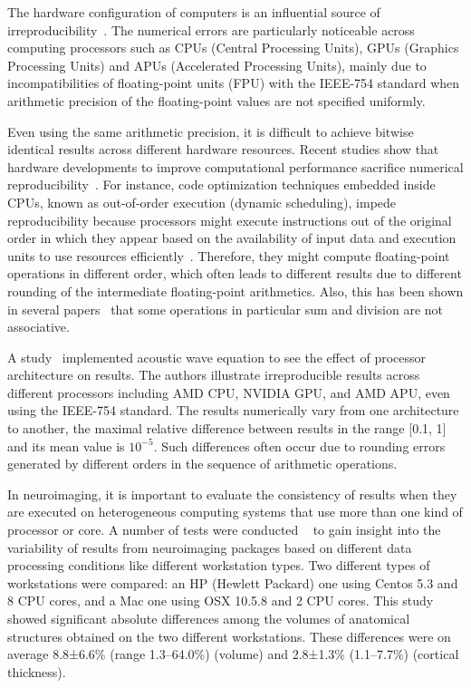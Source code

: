 The hardware configuration of computers is an 
influential source of irreproducibility~\cite{hill2017numerical}. 
The numerical errors are particularly noticeable across computing processors 
such as CPUs (Central Processing Units), GPUs (Graphics Processing 
Units) and APUs (Accelerated Processing Units), mainly due to incompatibilities 
of floating-point units (FPU) with the IEEE-754 standard when 
arithmetic precision of the floating-point values are not specified 
uniformly.

Even using the same arithmetic precision, it is difficult to achieve 
bitwise identical results across different hardware resources. 
Recent studies show that hardware developments to improve 
computational performance sacrifice numerical 
reproducibility~\cite{duben2014use, demmel2013numerical}. For instance, 
code optimization techniques embedded inside CPUs, known as 
out-of-order execution (dynamic scheduling), impede 
reproducibility because processors might execute 
instructions out of the original order in which they appear based on the 
availability of input data and execution units to use resources 
efficiently~\cite{wiki2018out-of-order}. Therefore, they might compute 
floating-point operations in different order,
which often leads to different results
due to different rounding of the intermediate floating-point arithmetics.
Also, this has been shown in several papers~\cite{duben2014use, demmel2013numerical} 
that some operations in particular sum and division are not associative.

A study~\cite{jezequel2015estimation} implemented
acoustic wave equation to see the effect of processor architecture on 
results. The authors illustrate irreproducible results across 
different processors including AMD CPU, NVIDIA GPU, and AMD APU, even 
using the IEEE-754 standard. The results numerically vary from one 
architecture to another, the maximal relative difference between 
results in the range [0.1, 1] and its mean value is $10^{-5}$. Such 
differences often occur due to rounding errors generated by different 
orders in the sequence of arithmetic operations.

In neuroimaging, it is important to evaluate the consistency of  
results when they are executed on heterogeneous computing systems
that use more than one kind of processor or core.
A number of tests were conducted 
~\cite{Gronenschild2012} to gain insight into the variability of  
results from neuroimaging packages based on different data processing 
conditions like different workstation types. Two
different types of workstations were compared: an HP (Hewlett Packard) one 
using Centos 5.3 and 8 CPU cores, and a Mac one using OSX 10.5.8 and 2 
CPU cores. This study showed significant absolute differences among 
the volumes of anatomical structures obtained on the two different 
workstations. 
These differences were on average 8.8±6.6\% (range 1.3–64.0\%) (volume) and 2.8±1.3\% (1.1–7.7\%) (cortical thickness). 


